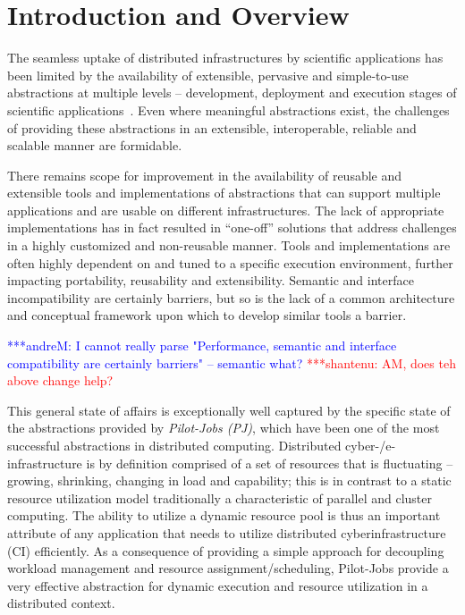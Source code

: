 \documentclass[conference,final]{IEEEtran}
\newcommand{\jhanote}[1]{ {\textcolor{red} { ***shantenu: #1 }}}
\newcommand{\amnote}[1]{ {\textcolor{blue} { ***andreM: #1 }}}
\newcommand{\amnote}[1]{}
\newcommand{\jhanote}[1]{}
\newcommand{\pilotjobs}{Pilot-Jobs\xspace}
\newcommand{\upp}{\vspace*{-0.5em}}
\begin{document}
\section{Introduction and Overview \upp\upp} 
The seamless uptake of distributed infrastructures by scientific
applications has been limited by the availability of extensible,
pervasive and simple-to-use abstractions at multiple levels --
development, deployment and execution stages of scientific
applications~\cite{dpagrid2009}.  Even where meaningful abstractions
exist, the challenges of providing these abstractions in an
extensible, interoperable, reliable and scalable manner are
formidable.  

There remains scope for improvement in the availability of reusable
and extensible tools and implementations of abstractions that can
support multiple applications and are usable on different
infrastructures.  The lack of appropriate implementations has in fact
resulted in ``one-off'' solutions that address challenges in a highly
customized and non-reusable manner.  Tools and implementations are
often highly dependent on and tuned to a specific execution
environment, further impacting portability, reusability and
extensibility.  Semantic and interface incompatibility are certainly
barriers, but so is the lack of a common architecture and conceptual
framework upon which to develop similar tools a barrier.

\amnote{I cannot really parse "Performance, semantic and interface
  compatibility are certainly barriers" -- semantic what?}
\jhanote{AM, does teh above change help?}


This general state of affairs is exceptionally well captured by the
specific state of the abstractions provided by {\it Pilot-Jobs (PJ)},
which have been one of the most successful abstractions in distributed
computing. Distributed cyber-/e-infrastructure is by definition
comprised of a set of resources that is fluctuating -- growing,
shrinking, changing in load and capability; this is in contrast to a
static resource utilization model traditionally a characteristic of
parallel and cluster computing.  The ability to utilize a dynamic
resource pool is thus an important attribute of any application that
needs to utilize distributed cyberinfrastructure (CI) efficiently. As a
consequence of providing a simple approach for decoupling workload
management and resource assignment/scheduling, \pilotjobs provide a
very effective abstraction for dynamic execution and resource
utilization in a distributed context.
\end{document}
